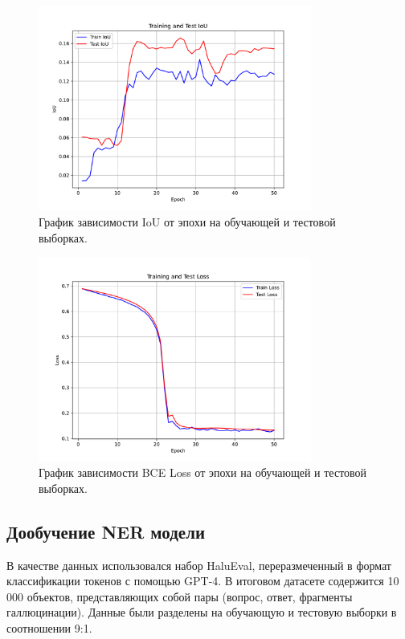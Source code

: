 \documentclass[12pt]{article}
\begin{document}
\begin{figure}[h]
    \centering
    \includegraphics[width=0.8\textwidth]{images/iou_plot (1).pdf}
    \caption{График зависимости IoU от эпохи на обучающей и тестовой выборках.}
    \label{fig:ious_train}
\end{figure}
\begin{figure}[h]
    \centering
    \includegraphics[width=0.8\textwidth]{images/loss_plot (1).pdf}
    \caption{График зависимости BCE Loss от эпохи на обучающей и тестовой выборках.}
    \label{fig:loss_train}
\end{figure}

 \subsection{Дообучение  NER модели}
В качестве данных использовался набор HaluEval, переразмеченный в формат классификации токенов с помощью GPT-4. В итоговом датасете содержится 10 000 объектов, представляющих собой пары (вопрос, ответ, фрагменты галлюцинации). Данные были разделены на обучающую и тестовую выборки в соотношении 9:1.
\end{document}
